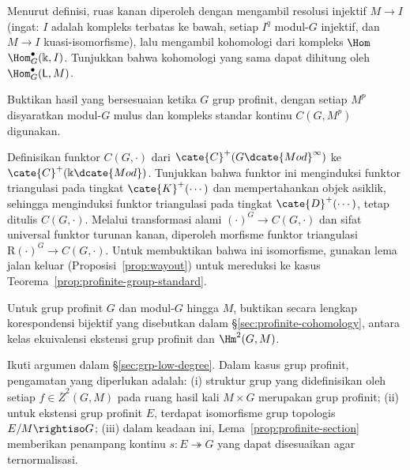 \begin{Exercises}
	\begin{hint}
		Menurut definisi, ruas kanan diperoleh dengan mengambil resolusi injektif
		$M\to I$ (ingat: $I$ adalah kompleks terbatas ke bawah, setiap $I^q$
		modul-$G$ injektif, dan $M\to I$ kuasi-isomorfisme), lalu mengambil
		kohomologi dari kompleks $\Hom$
		$\Hom^\bullet_G(\Bbbk,I)$. Tunjukkan bahwa kohomologi yang sama dapat
		dihitung oleh $\Hom^\bullet_G(\mathsf{L},M)$.
	\end{hint}

	\item Buktikan hasil yang bersesuaian ketika $G$ grup profinit, dengan
	setiap $M^p$ disyaratkan modul-$G$ mulus dan kompleks standar kontinu
	$C(G,M^p)$ digunakan.

	\begin{hint}
		Definisikan funktor $C(G,\cdot)$ dari
		$\cate{C}^+(G\dcate{Mod}^\infty)$ ke
		$\cate{C}^+(\Bbbk\dcate{Mod})$. Tunjukkan bahwa funktor ini menginduksi
		funktor triangulasi pada tingkat $\cate{K}^+(\cdots)$ dan
		mempertahankan objek asiklik, sehingga menginduksi funktor triangulasi
		pada tingkat $\cate{D}^+(\cdots)$, tetap ditulis $C(G,\cdot)$. Melalui
		transformasi alami $(\cdot)^G\to C(G,\cdot)$ dan sifat universal
		funktor turunan kanan, diperoleh morfisme funktor triangulasi
		$\mathrm{R}(\cdot)^G\to C(G,\cdot)$. Untuk membuktikan bahwa ini
		isomorfisme, gunakan lema jalan keluar (Proposisi~\ref{prop:wayout})
		untuk mereduksi ke kasus Teorema~\ref{prop:profinite-group-standard}.
	\end{hint}

	\item Untuk grup profinit $G$ dan modul-$G$ hingga $M$, buktikan secara
	lengkap korespondensi bijektif yang disebutkan dalam
	\S\ref{sec:profinite-cohomology}, antara kelas ekuivalensi ekstensi grup
	profinit dan $\Hm^2(G,M)$.

	\begin{hint}
		Ikuti argumen dalam \S\ref{sec:grp-low-degree}. Dalam kasus grup profinit,
		pengamatan yang diperlukan adalah: (i) struktur grup yang didefinisikan
		oleh setiap $f\in\overline{Z}^2(G,M)$ pada ruang hasil kali $M\times G$
		merupakan grup profinit; (ii) untuk ekstensi grup profinit $E$, terdapat
		isomorfisme grup topologis $E/M\rightiso G$; (iii) dalam keadaan ini,
		Lema~\ref{prop:profinite-section} memberikan penampang kontinu
		$s:E\twoheadrightarrow G$ yang dapat disesuaikan agar ternormalisasi.
	\end{hint}


\end{Exercises}
